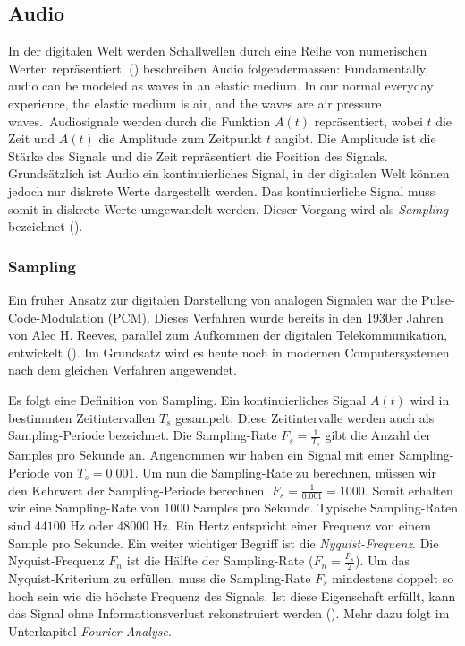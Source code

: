 \documentclass[11pt,a4paper]{article}
\begin{document}
\subsection{Audio}
In der digitalen Welt werden Schallwellen durch eine Reihe von numerischen Werten
repräsentiert. (\cite[p.9]{somberg2019audioapi}) beschreiben Audio folgendermassen: \glqq Fundamentally,
audio can be modeled as waves in an elastic medium. In our normal everyday experience, the elastic
medium is air, and the waves are air pressure waves.\grqq \ Audiosignale werden durch die Funktion
\(A(t)\) repräsentiert, wobei \(t\) die Zeit und \(A(t)\) die Amplitude zum
Zeitpunkt \(t\) angibt. Die Amplitude ist die Stärke des Signals und die Zeit repräsentiert die
Position des Signals. Grundsätzlich ist Audio ein kontinuierliches Signal, in der digitalen Welt 
können jedoch nur diskrete Werte dargestellt werden. Das kontinuierliche Signal muss somit in 
diskrete Werte umgewandelt werden. Dieser Vorgang wird als \textit{Sampling} bezeichnet 
(\cite[Chapter~3.1]{tarr2018hackaudio}). 


\subsubsection{Sampling}
Ein früher Ansatz zur digitalen Darstellung von analogen Signalen war die Pulse-Code-Modulation
(PCM). Dieses Verfahren wurde bereits in den 1930er Jahren von Alec H. Reeves, parallel zum 
Aufkommen der digitalen Telekommunikation, entwickelt (\cite[p.~57]{deloraine1965pcm}). Im Grundsatz 
wird es heute noch in modernen Computersystemen nach dem gleichen Verfahren angewendet.

\noindent \newline
Es folgt eine Definition von Sampling. Ein kontinuierliches Signal \(A(t)\)
wird in bestimmten Zeitintervallen \(T_s\) gesampelt. Diese Zeitintervalle werden auch als
Sampling-Periode bezeichnet. Die Sampling-Rate \(F_s = \displaystyle\frac{1}{T_s}\) gibt die Anzahl
der Samples pro Sekunde an. Angenommen wir haben ein Signal mit einer Sampling-Periode
von \(T_s = 0.001\). Um nun die Sampling-Rate zu berechnen, müssen wir den Kehrwert der
Sampling-Periode berechnen. \(F_s = \displaystyle\frac{1}{0.001} = 1000\). Somit erhalten wir eine
Sampling-Rate von \(1000\) Samples pro Sekunde. Typische Sampling-Raten sind \(44100\) Hz
oder \(48000\) Hz. Ein Hertz entspricht einer Frequenz von einem Sample pro Sekunde. 
Ein weiter wichtiger Begriff ist die \textit{Nyquist-Frequenz}. Die Nyquist-Frequenz \(F_n\) ist die 
Hälfte der Sampling-Rate (\(F_n = \displaystyle\frac{F_s}{2}\)). Um das Nyquist-Kriterium zu erfüllen, 
muss die Sampling-Rate \(F_s\) mindestens doppelt so hoch sein wie die höchste Frequenz des Signals. 
Ist diese Eigenschaft erfüllt, kann das Signal ohne Informationsverlust rekonstruiert werden 
(\cite[Chapter~3.1]{tarr2018hackaudio}). Mehr dazu folgt im Unterkapitel \textit{Fourier-Analyse}.
\end{document}
